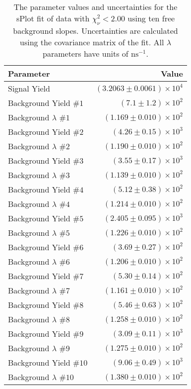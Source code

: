 
\begin{table}[ht]
    \begin{center}
        \begin{tabular}{lr}\toprule
            Parameter & Value \\\midrule
            Signal Yield & $(3.2063 \pm 0.0061) \times 10^{4}$ \\
            Background Yield $\#1$ & $(7.1 \pm 1.2) \times 10^{2}$ \\
            Background $\lambda$ $\#1$ & $(1.169 \pm 0.010) \times 10^{2}$ \\
            Background Yield $\#2$ & $(4.26 \pm 0.15) \times 10^{3}$ \\
            Background $\lambda$ $\#2$ & $(1.190 \pm 0.010) \times 10^{2}$ \\
            Background Yield $\#3$ & $(3.55 \pm 0.17) \times 10^{3}$ \\
            Background $\lambda$ $\#3$ & $(1.139 \pm 0.010) \times 10^{2}$ \\
            Background Yield $\#4$ & $(5.12 \pm 0.38) \times 10^{2}$ \\
            Background $\lambda$ $\#4$ & $(1.214 \pm 0.010) \times 10^{2}$ \\
            Background Yield $\#5$ & $(2.405 \pm 0.095) \times 10^{3}$ \\
            Background $\lambda$ $\#5$ & $(1.226 \pm 0.010) \times 10^{2}$ \\
            Background Yield $\#6$ & $(3.69 \pm 0.27) \times 10^{2}$ \\
            Background $\lambda$ $\#6$ & $(1.206 \pm 0.010) \times 10^{2}$ \\
            Background Yield $\#7$ & $(5.30 \pm 0.14) \times 10^{2}$ \\
            Background $\lambda$ $\#7$ & $(1.161 \pm 0.010) \times 10^{2}$ \\
            Background Yield $\#8$ & $(5.46 \pm 0.63) \times 10^{2}$ \\
            Background $\lambda$ $\#8$ & $(1.258 \pm 0.010) \times 10^{2}$ \\
            Background Yield $\#9$ & $(3.09 \pm 0.11) \times 10^{3}$ \\
            Background $\lambda$ $\#9$ & $(1.275 \pm 0.010) \times 10^{2}$ \\
            Background Yield $\#10$ & $(9.06 \pm 0.49) \times 10^{3}$ \\
            Background $\lambda$ $\#10$ & $(1.380 \pm 0.010) \times 10^{2}$ \\\bottomrule
        \end{tabular}
        \caption{The parameter values and uncertainties for the sPlot fit of data with $\chi^2_\nu < 2.00$ using ten free background slopes. Uncertainties are calculated using the covariance matrix of the fit. All $\lambda$ parameters have units of $\si{\nano\second}^{-1}$.}\label{tab:splot-fit-results-chisqdof-2.00-free-10}
    \end{center}
\end{table}
